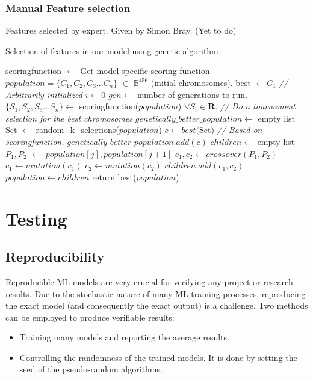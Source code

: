 \documentclass[11pt]{article}
\begin{document}
\subsubsection{Manual Feature selection}
Features selected by expert. Given by Simon Bray. (Yet to do)

\begin{algorithm}
\caption{Selection of features in our model using genetic algorithm \cite{genetic_algorithm}}
\label{alg:GeneticAlgo}
\begin{algorithmic}[1]
\State scoringfunction $\gets$ Get model specific scoring function
\State $ population = \{C_1, C_2, C_3... C_n\}$ $\in$ $\mathbb{B}^{456}$ (initial chromosomes).
\State best $\gets C_1$  \textit{// Arbitrarily initialized}
\State $i \gets 0$
\State $gen \gets$ number of generations to run.
          \State $\{S_1, S_2, S_3... S_n\} \gets$ scoringfunction($population$) $\forall S_i \in \mathbf{R}$.
          \State \textit{// Do a tournament selection for the best chromosomes}
          \State $genetically\_better\_population \gets$ empty list
              \State Set $\gets$ random\_k\_selections($population$)
              \State $c \gets best($Set$)$ \textit{// Based on scoringfunction.}
              \State $genetically\_better\_population.add(c)$
          \EndFor
          \State $children \gets$ empty list
              \State $P_1, P_2$ $\gets$ $population[j], population[j+1]$
              \State $c_1, c_2 \gets crossover(P_1, P_2)$
              \State $c_1 \gets mutation(c_1)$
              \State $c_2 \gets mutation(c_2)$
              \State $children.add(c_1, c_2)$
          \EndFor
          \State $population \gets children$
      \EndFor
\State return best($population$)
\EndProcedure
\end{algorithmic}
\end{algorithm}

\section{Testing}
\subsection{Reproducibility}
Reproducible ML models are very crucial for verifying any project or research results. Due to the stochastic nature of many ML training processes, reproducing the exact model (and consequently the exact output) is a challenge. Two methods can be employed to produce verifiable results:
\begin{itemize}
\item Training many models and reporting the average results.
\item Controlling the randomness of the trained models. It is done by setting the seed of the pseudo-random algorithms.
\end{itemize}
\end{document}
